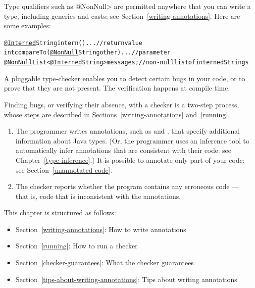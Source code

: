 Type qualifiers such as \<@NonNull> are permitted anywhere
that you can write a type, including generics and casts; see
Section~\ref{writing-annotations}.  Here are some examples:

\begin{alltt}
  \underline{@Interned} String intern() \ttlcb{} ... \ttrcb{}             // return value
  int compareTo(\underline{@NonNull} String other) \ttlcb{} ... \ttrcb{}  // parameter
  \underline{@NonNull} List<\underline{@Interned} String> messages;     // non-null list of interned Strings
\end{alltt}


\htmlhr
{}

A pluggable type-checker enables you to detect certain bugs in your code,
or to prove that they are not present.  The verification happens at compile
time.


Finding bugs, or verifying their absence, with a checker is a two-step process, whose steps are
described in Sections~\ref{writing-annotations} and~\ref{running}.

\begin{enumerate}

\item The programmer writes annotations, such as  and
  , that specify additional information about Java types.
  (Or, the programmer uses an inference tool to automatically infer
  annotations that are consistent with their code:  see Chapter~\ref{type-inference}.)
  It is possible to annotate only part of your code:  see
  Section~\ref{unannotated-code}.

\item The checker reports whether the program contains any erroneous code
  --- that is, code that is inconsistent with the annotations.

\end{enumerate}

This chapter is structured as follows:
\begin{itemize}
\item Section~\ref{writing-annotations}: How to write annotations
\item Section~\ref{running}:  How to run a checker
\item Section~\ref{checker-guarantees}: What the checker guarantees
\item Section~\ref{tips-about-writing-annotations}: Tips about writing annotations
\end{itemize}

